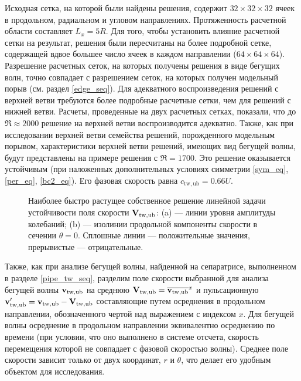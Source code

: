 Исходная сетка, на которой были найдены решения, содержит $32 \times 32 \times 32$ ячеек в продольном, радиальном и угловом направлениях. Протяженность расчетной области составляет $L_x = 5R$. Для того, чтобы установить влияние расчетной сетки на результат, решения были пересчитаны на более подробной сетке, содержащей вдвое большее число ячеек в каждом направлении ($64 \times 64 \times 64$). Разрешение расчетных сеток, на которых получены решения в виде бегущих волн, точно совпадает с разрешением сеток, на которых получен модельный порыв (см. раздел \ref{edge_seq}). Для адекватного воспроизведения решений с верхней ветви требуются более подробные расчетные сетки, чем для решений с нижней ветви. Расчеты, проведенные на двух расчетных сетках, показали, что до $\Re \approx 2000$ решение на верхней ветви воспроизводится адекватно. Также, как при исследовании верхней ветви семейства решений, порожденного модельным порывом, характеристики верхней ветви решений, имеющих вид бегущей волны, будут представлены на примере решения с $\Re = 1700$. Это решение оказывается устойчивым (при наложенных дополнительных условиях симметрии \eqref{sym_eq}, \eqref{per_eq}, \eqref{bc2_eq}). Его фазовая скорость равна $c_\mathrm{tw,ub} = 0.66U$. 

\begin{figure}
\caption{Наиболее быстро растущее собственное решение линейной задачи устойчивости поля скорости $\mathbf{V}_\mathrm{tw,ub}$: (a) --- линии уровня амплитуды колебаний; (b) --- изолинии продольной компоненты скорости в сечении $\theta = 0$. Сплошные линии --- положительные значения, прерывистые --- отрицательные.}
\label{pipeTWub_lin_pic}
\end{figure}

Также, как при анализе бегущей волны, найденной на сепаратрисе, выполненном в разделе \ref{pipe_tw_seq}, разделим поле скорости выбранной для анализа бегущей волны $\mathbf{v}_\mathrm{tw,ub}$ на среднюю $\mathbf{V}_\mathrm{tw,ub} = \overline{\mathbf{v}_\mathrm{tw,ub}}^x$ и пульсационную $\mathbf{v}'_\mathrm{tw,ub} = \mathbf{v}_\mathrm{tw,ub} - \mathbf{V}_\mathrm{tw,ub}$ составляющие путем осреднения в продольном направлении, обозначенного чертой над выражением с индексом $x$.  Для бегущей волны осреднение в продольном направлении эквивалентно осреднению по времени (при условии, что оно выполнено в системе отсчета, скорость перемещения которой не совпадает с фазовой скоростью волны). Среднее поле скорости зависит только от двух координат, $r$ и $\theta$, что делает его удобным объектом для исследования. 

